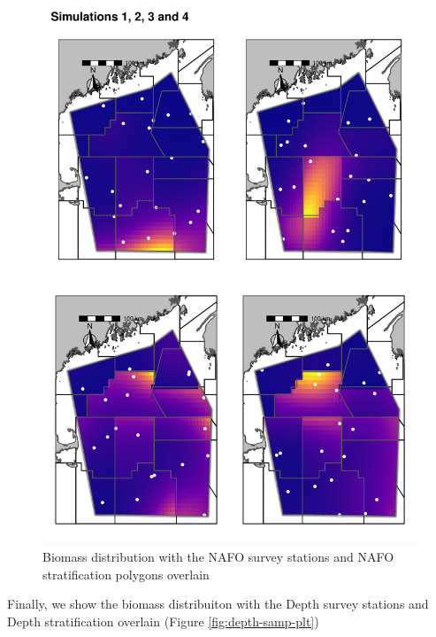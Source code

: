 \documentclass[
]{article}
\begin{document}
\begin{figure}
\centering
\includegraphics{Survey_tutortial_files/figure-latex/nafo-samp-plt-1.pdf}
\caption{\label{fig:nafo-samp-plt}Biomass distribution with the NAFO survey stations and NAFO stratification polygons overlain}
\end{figure}

Finally, we show the biomass distribuiton with the Depth survey stations and Depth stratification overlain (Figure \ref{fig:depth-samp-plt})
\end{document}
